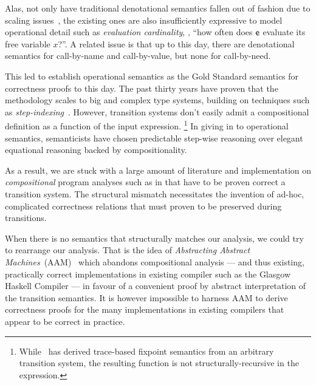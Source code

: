 Alas, not only have traditional denotational semantics fallen out of fashion
due to scaling issues~\citep{WrightFelleisen:94}, the existing ones are also
insufficiently expressive to model operational detail such as \emph{evaluation
cardinality}, \eg, ``how often does $\mathsf{e}$ evaluate its free variable $x$?''.
A related issue is that up to this day, there are denotational semantics for
call-by-name and call-by-value, but none for call-by-need.

This led \citet{WrightFelleisen:94} to establish operational semantics as the
Gold Standard semantics for correctness proofs to this day.
The past thirty years have proven that the methodology scales to
big and complex type systems, building on techniques such as
\emph{step-indexing}~\citep{AppelMcAllester:01,DreyerAhmedBirkedal:11}.
However, transition systems don't easily admit a compositional definition as a
function of the input expression.%
\footnote{While~\citet{Cousot:02} has derived trace-based fixpoint
semantics from an arbitrary transition system, the resulting function is not
structurally-recursive in the expression.}
In giving in to operational semantics, semanticists have chosen predictable
step-wise reasoning over elegant equational reasoning backed by
compositionality.


As a result, we are stuck with a large amount of literature and implementation
on \emph{compositional} program analyses such as in \citet{cardinality-ext}
that have to be proven correct \wrt a transition system.
The structural mismatch necessitates the invention of ad-hoc, complicated
correctness relations that must proven to be preserved during transitions.

When there is no semantics that structurally matches our analysis, we could
try to rearrange our analysis.
That is the idea of \emph{Abstracting Abstract Machines}~(AAM)~\citep{aam} which
abandons compositional analysis --- and thus existing, practically correct
implementations in existing compiler such as the Glasgow Haskell Compiler ---
in favour of a convenient proof by abstract interpretation of the transition
semantics.
It is however impossible to harness AAM to derive correctness proofs for
the many implementations in existing compilers that appear to be correct in
practice.

